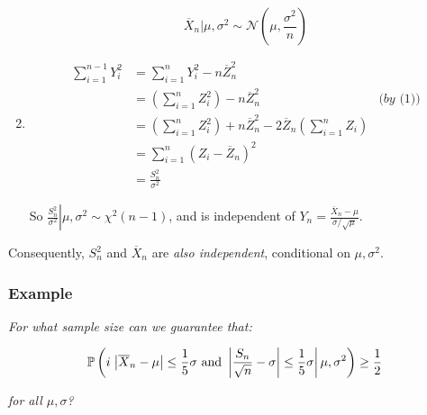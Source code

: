 \documentclass[a4paper]{article}
\begin{document}
\begin{enumerate}
                            \[
                                \overline X_n | \mu, \sigma^2 \sim
                                \mathcal{N}\left(\mu, \frac{\sigma^2}{n}\right)
                            \]

                        \item
                            \begin{align*}
                                \sum_{i=1}^{n-1} Y_i^2 & = \sum_{i=1}^n Y_i^2 -
                                    n \overline Z_n^2 \\
                                & = \left(\sum_{i=1}^n Z_i^2\right) - n\overline
                                    Z_n^2 & \textit{(by (1))} \\
                                & = \left(\sum_{i=1}^n Z_i^2\right) + n\overline
                                    Z_n^2 - 2\overline Z_n \left(\sum_{i=1}^n
                                    Z_i\right) \\
                                & = \sum_{i=1}^n \left(Z_i - \overline Z_n
                                    \right)^2 \\
                                & = \frac{S_n^2}{\sigma^2}
                            \end{align*}

                            So $\left.\frac{S_n^2}{\sigma^2}\right| \mu,
                            \sigma^2 \sim \chi^2(n - 1)$, and is independent of
                            $Y_n = \frac{\overline X_n - \mu}{\sigma /
                            \sqrt{\mu}}$.
                    \end{enumerate}

                    Consequently, $S_n^2$ and $\overline X_n$ are \textit{also
                    independent}, conditional on $\mu, \sigma^2$.

            \subsubsection{Example}
                \textit{For what sample size can we guarantee that:}

                \[
                    \mathbb{P}\left(i\left.\left|\overline X_n - \mu\right| \leq
                    \frac{1}{5}\sigma \text{ and } \left|\frac{S_n}{\sqrt{n}} -
                    \sigma\right| \leq \frac{1}{5}\sigma\right|\mu, \sigma^2
                    \right) \geq \frac{1}{2}
                \]

                \textit{for all $\mu, \sigma$?}
\end{document}
